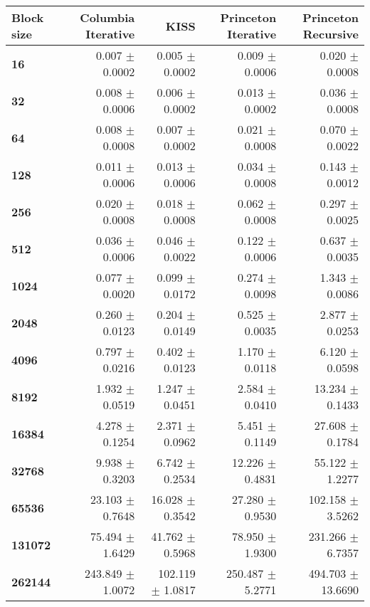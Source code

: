 \begin{tabular}{lrrrr}\toprule
\textbf{Block size}  & \textbf{Columbia Iterative} & \textbf{KISS} & \textbf{Princeton Iterative} & \textbf{Princeton Recursive}\\\midrule
\textbf{16}  & 0.007 $\pm$ 0.0002 & 0.005 $\pm$ 0.0002 & 0.009 $\pm$ 0.0006 & 0.020 $\pm$ 0.0008\\
\textbf{32}  & 0.008 $\pm$ 0.0006 & 0.006 $\pm$ 0.0002 & 0.013 $\pm$ 0.0002 & 0.036 $\pm$ 0.0008\\
\textbf{64}  & 0.008 $\pm$ 0.0008 & 0.007 $\pm$ 0.0002 & 0.021 $\pm$ 0.0008 & 0.070 $\pm$ 0.0022\\
\textbf{128}  & 0.011 $\pm$ 0.0006 & 0.013 $\pm$ 0.0006 & 0.034 $\pm$ 0.0008 & 0.143 $\pm$ 0.0012\\
\textbf{256}  & 0.020 $\pm$ 0.0008 & 0.018 $\pm$ 0.0008 & 0.062 $\pm$ 0.0008 & 0.297 $\pm$ 0.0025\\
\textbf{512}  & 0.036 $\pm$ 0.0006 & 0.046 $\pm$ 0.0022 & 0.122 $\pm$ 0.0006 & 0.637 $\pm$ 0.0035\\
\textbf{1024}  & 0.077 $\pm$ 0.0020 & 0.099 $\pm$ 0.0172 & 0.274 $\pm$ 0.0098 & 1.343 $\pm$ 0.0086\\
\textbf{2048}  & 0.260 $\pm$ 0.0123 & 0.204 $\pm$ 0.0149 & 0.525 $\pm$ 0.0035 & 2.877 $\pm$ 0.0253\\
\textbf{4096}  & 0.797 $\pm$ 0.0216 & 0.402 $\pm$ 0.0123 & 1.170 $\pm$ 0.0118 & 6.120 $\pm$ 0.0598\\
\textbf{8192}  & 1.932 $\pm$ 0.0519 & 1.247 $\pm$ 0.0451 & 2.584 $\pm$ 0.0410 & 13.234 $\pm$ 0.1433\\
\textbf{16384}  & 4.278 $\pm$ 0.1254 & 2.371 $\pm$ 0.0962 & 5.451 $\pm$ 0.1149 & 27.608 $\pm$ 0.1784\\
\textbf{32768}  & 9.938 $\pm$ 0.3203 & 6.742 $\pm$ 0.2534 & 12.226 $\pm$ 0.4831 & 55.122 $\pm$ 1.2277\\
\textbf{65536}  & 23.103 $\pm$ 0.7648 & 16.028 $\pm$ 0.3542 & 27.280 $\pm$ 0.9530 & 102.158 $\pm$ 3.5262\\
\textbf{131072}  & 75.494 $\pm$ 1.6429 & 41.762 $\pm$ 0.5968 & 78.950 $\pm$ 1.9300 & 231.266 $\pm$ 6.7357\\
\textbf{262144} & 243.849 $\pm$ 1.0072 & 102.119 $\pm$ 1.0817 & 250.487 $\pm$ 5.2771 & 494.703 $\pm$ 13.6690\\
\bottomrule
\end{tabular}
